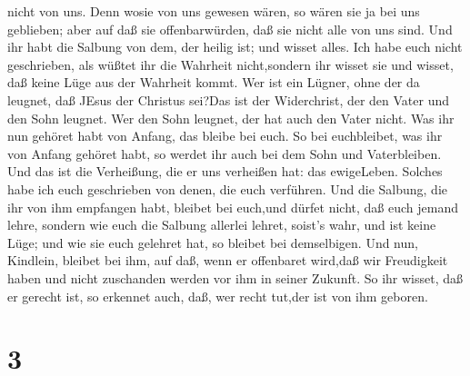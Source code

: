 nicht von uns. Denn wosie von uns gewesen wären, so wären sie ja bei uns
geblieben; aber auf daß sie offenbarwürden, daß sie nicht alle von uns
sind.  Und ihr habt die Salbung von dem, der heilig ist;
und wisset alles.  Ich habe euch nicht geschrieben, als
wüßtet ihr die Wahrheit nicht,sondern ihr wisset sie und wisset, daß
keine Lüge aus der Wahrheit kommt.  Wer ist ein Lügner,
ohne der da leugnet, daß JEsus der Christus sei?Das ist der Widerchrist,
der den Vater und den Sohn leugnet.  Wer den Sohn leugnet,
der hat auch den Vater nicht.  Was ihr nun gehöret habt von
Anfang, das bleibe bei euch. So bei euchbleibet, was ihr von Anfang
gehöret habt, so werdet ihr auch bei dem Sohn und Vaterbleiben.
 Und das ist die Verheißung, die er uns verheißen hat: das
ewigeLeben.  Solches habe ich euch geschrieben von denen,
die euch verführen.  Und die Salbung, die ihr von ihm
empfangen habt, bleibet bei euch,und dürfet nicht, daß euch jemand
lehre, sondern wie euch die Salbung allerlei lehret, soist's wahr, und
ist keine Lüge; und wie sie euch gelehret hat, so bleibet bei
demselbigen.  Und nun, Kindlein, bleibet bei ihm, auf daß,
wenn er offenbaret wird,daß wir Freudigkeit haben und nicht zuschanden
werden vor ihm in seiner Zukunft.  So ihr wisset, daß er
gerecht ist, so erkennet auch, daß, wer recht tut,der ist von ihm
geboren.

\hypertarget{section-2}{%
\section{3}\label{section-2}}

